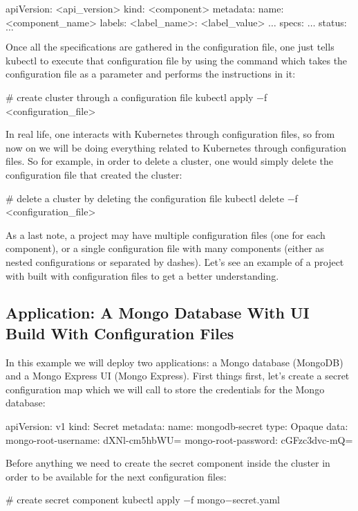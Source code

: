 \begin{block}
apiVersion: <api_version>
kind: <component>
metadata:
    name: <component_name>
    labels:
        <label_name>: <label_value>
    $\dots$
specs:
    $\dots$
status:
    $\dots$
\end{block}

Once all the specifications are gathered in the configuration file, one just tells kubectl to execute that configuration
file by using the  command which takes the configuration file as a parameter and performs the
instructions in it:
\begin{bash}
# create cluster through a configuration file
kubectl apply $-$f <configuration_file>
\end{bash}

In real life, one interacts with Kubernetes through configuration files, so from now on we will be doing everything
related to Kubernetes through configuration files. So for example, in order to delete a cluster, one would simply
delete the configuration file that created the cluster:
\begin{bash}
# delete a cluster by deleting the configuration file
kubectl delete $-$f <configuration_file>
\end{bash}

As a last note, a project may have multiple configuration files (one for each component), or a single configuration file
with many components (either as nested configurations or separated by dashes). \v

Let's see an example of a project with built with configuration files to get a better understanding.

\subsection*{Application: A Mongo Database With UI Build With Configuration Files}

In this example we will deploy two applications: a Mongo database (MongoDB) and a Mongo Express UI (Mongo Express).
First things first, let's create a secret configuration map which we will call  to store the
credentials for the Mongo database:
\begin{block}
apiVersion: v1
kind: Secret
metadata:
    name: mongodb-secret
type: Opaque
data:
    mongo-root-username: dXNl-cm5hbWU=
    mongo-root-password: cGFzc3dvc-mQ=
\end{block}

Before anything we need to create the secret component inside the cluster in order to be available for the next
configuration files:
\begin{bash}
# create secret component
kubectl apply $-$f mongo$-$secret.yaml
\end{bash}

